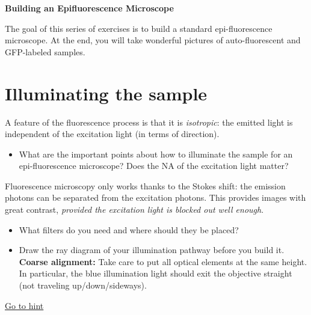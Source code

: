 \documentclass[a4paper]{report}
\begin{document}
\setcounter{secnumdepth}{2}
\begin{center}
	\textbf{\Large{Building an Epifluorescence Microscope}}
\end{center}

The goal of this series of exercises is to build a standard epi-fluorescence microscope. At the end, you will take wonderful pictures of auto-fluorescent and GFP-labeled samples.



\section{Illuminating the sample}
\hypertarget{hintBack-illumination}{}
A feature of the fluorescence process is that it is \emph{isotropic}: the emitted light is independent of the excitation light (in terms of direction).
\begin{itemize}
    \item What are the important points about how to illuminate the sample for an epi-fluorescence microscope? Does the NA of the excitation light matter?
   \end{itemize}
   Fluorescence microscopy only works thanks to the Stokes shift: the emission photons can be separated from the excitation photons. This provides images with great contrast, \emph{provided the excitation light is blocked out well enough}.
   \begin{itemize}
    \item What filters do you need and where should they be placed?
    \item Draw the ray diagram of your illumination pathway before you build it. \textbf{Coarse alignment:} Take care to put all optical elements at the same height. In particular, the blue illumination light should exit the objective straight (not traveling up/down/sideways).
\end{itemize}
\hyperlink{hintTo-illumination}{Go to hint}


\end{document}

